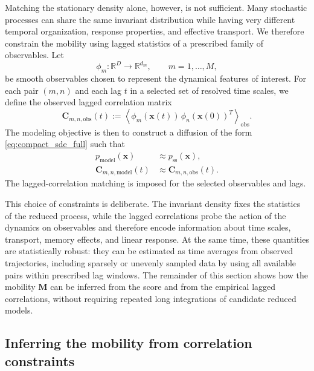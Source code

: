 \documentclass[11pt,twoside,fleqn]{article}
\begin{document}
Matching the stationary density alone, however, is not sufficient. Many stochastic processes can share the same invariant distribution while having very different temporal organization, response properties, and effective transport. We therefore constrain the mobility using lagged statistics of a prescribed family of observables. Let
\begin{equation}
    \phi_m:\mathbb{R}^D\to\mathbb{R}^{d_m},
    \qquad
    m=1,\dots,M,
    \label{eq:observable_family_method}
\end{equation}
be smooth observables chosen to represent the dynamical features of interest. For each pair $(m,n)$ and each lag $t$ in a selected set of resolved time scales, we define the observed lagged correlation matrix
\begin{equation}
    \bm{C}_{m,n,\mathrm{obs}}(t)
    :=
    \left\langle
        \phi_m(\bm{x}(t))\,
        \phi_n(\bm{x}(0))^T
    \right\rangle_{\mathrm{obs}} .
    \label{eq:Cm_definition}
\end{equation}
The modeling objective is then to construct a diffusion of the form \eqref{eq:compact_sde_full} such that
\begin{equation}
\begin{aligned}
    p_{\mathrm{model}}(\bm{x})
    &\approx
    p_{\mathrm{ss}}(\bm{x}),
    \\
    \bm{C}_{m,n,\mathrm{model}}(t)
    &\approx
    \bm{C}_{m,n,\mathrm{obs}}(t).
\end{aligned}
    \label{eq:modeling_objective}
\end{equation}
The lagged-correlation matching is imposed for the selected observables and lags.

This choice of constraints is deliberate. The invariant density fixes the statistics of the reduced process, while the lagged correlations probe the action of the dynamics on observables and therefore encode information about time scales, transport, memory effects, and linear response. At the same time, these quantities are statistically robust: they can be estimated as time averages from observed trajectories, including sparsely or unevenly sampled data by using all available pairs within prescribed lag windows. The remainder of this section shows how the mobility $\bm{M}$ can be inferred from the score and from the empirical lagged correlations, without requiring repeated long integrations of candidate reduced models.

\subsection{Inferring the mobility from correlation constraints}
\label{subsec:mobility_from_correlation_constraints}
\end{document}
